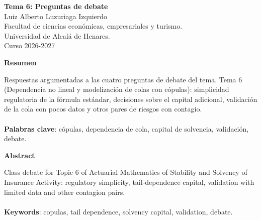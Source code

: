 \documentclass[a4paper,12pt]{article}
\begin{document}
\begin{titlepage}
    \centering
    \vspace*{0.1cm}
    \huge\textbf{Tema 6: Preguntas de debate}\\
    \vspace{1cm}
    \small{Luiz Alberto Luzuriaga Izquierdo}\\
    \vspace{0.1cm}
    Facultad de ciencias económicas, empresariales y turismo. \\
    \vspace{0.1cm}
    Universidad de Alcalá de Henares. \\
    \vspace{0.1cm}
    Curso 2026-2027\\
    \vspace{0.5cm}

{\bfseries Resumen}

\vspace{0.1cm}
\noindent
\begin{justify}
Respuestas argumentadas a las cuatro preguntas de debate del tema. Tema 6 (Dependencia no lineal y modelización de colas con cópulas): simplicidad regulatoria de la fórmula estándar, decisiones sobre el capital adicional, validación de la cola con pocos datos y otros pares de riesgos con contagio.\\\\
\vspace{0.1cm}
\noindent
\textbf{Palabras clave}: cópulas, dependencia de cola, capital de solvencia, validación, debate.
\end{justify}
\begin{center}
    {\bfseries Abstract}
\end{center}
\vspace{0.1cm}
\noindent
\begin{justify}
Class debate for Topic 6 of Actuarial Mathematics of Stability and Solvency of Insurance Activity: regulatory simplicity, tail-dependence capital, validation with limited data and other contagion pairs.\\\\
\vspace{0.1cm}
\noindent
\textbf{Keywords}: copulas, tail dependence, solvency capital, validation, debate.
\end{justify}

\end{titlepage}

\newpage{}
\renewcommand{\contentsname}{Índice}
\tableofcontents
\end{document}
